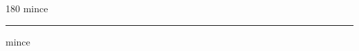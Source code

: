
\begin{frame}
\begin{center}
\begin{turn}{180}
{\fontsize{2.5cm}{1em}\selectfont mince}
\end{turn}
\vspace{1em}\par  
\hrule
\vspace{1em}\par  
{\fontsize{2.5cm}{1em}\selectfont mince}
\end{center}
\end{frame}
